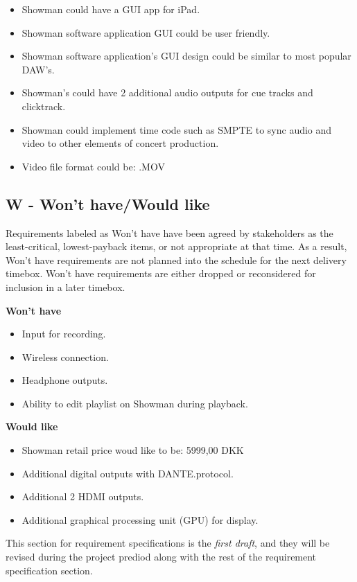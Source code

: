 \begin{itemize}
\item Showman could have a GUI app for iPad.
\item Showman software application GUI could be user friendly.
\item Showman software application's GUI design could be similar to most popular DAW's.
\item Showman's could have 2 additional audio outputs for cue tracks and clicktrack.
\item Showman could implement time code such as SMPTE to sync audio and video to other elements of concert production.
\item Video file format could be: .MOV
\end{itemize}

\subsection{W - Won't have/Would like}
Requirements labeled as Won't have have been agreed by stakeholders as the least-critical, lowest-payback items, or not appropriate at that time. As a result, Won't have requirements are not planned into the schedule for the next delivery timebox. Won't have requirements are either dropped or reconsidered for inclusion in a later timebox. \newline

\textbf{Won't have}
\begin{itemize}
\item Input for recording.
\item Wireless connection.
\item  Headphone outputs.
\item Ability to edit playlist on Showman during playback.
\end{itemize}

\textbf{Would like}
\begin{itemize}
\item Showman retail price woud like to be: 5999,00 DKK
\item Additional digital outputs with DANTE.protocol.
\item Additional 2 HDMI outputs. 
\item Additional graphical processing unit (GPU) for display.
\end{itemize}

This section for requirement specifications is the \textit{first draft}, and they will be revised during the project prediod along with the rest of the requirement specification section.